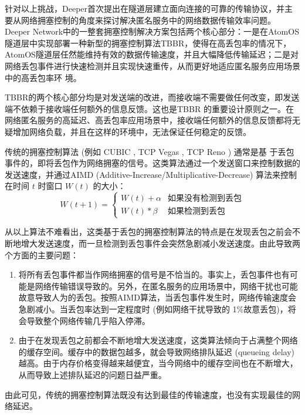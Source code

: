 \documentclass[a4paper]{article}
\begin{document}
针对以上挑战，Deeper首次提出在隧道层建立面向连接的可靠的传输协议，并主要从网络拥塞控制的角度来探讨解决匿名服务中的网络数据传输效率问题。Deeper Network中的一整套拥塞控制解决方案包括两个核心部分：一是在AtomOS隧道层中实现部署一种新型的拥塞控制算法TBBR，使得在高丢包率的情况下，AtomOS隧道层任然能维持有效的数据传输速度，并且大幅降低传输延迟；二是对网络丢包事件进行快速检测并且实现快速重传，从而更好地适应匿名服务应用场景中的高丢包率环
境。

TBBR的两个核心部分均是对发送端的改进，而接收端不需要做任何改变，即发送端不依赖于接收端任何额外的信息反馈。这也是TBBR 的重要设计原则之一。在网络匿名服务的高延迟、高丢包率应用场景中，接收端任何额外的信息反馈都将无疑增加网络负载，并且在这样的环境中，无法保证任何稳定的反馈。

传统的拥塞控制算法 (例如 CUBIC \cite{ha2008cubic}, TCP Vegas \cite{brakmo1995tcp}, TCP Reno \cite{padhye2000modeling}) 通常是基
于丢包事件的，即将丢包作为网络拥塞的信号。这类算法通过一个发送窗口来控制数据的发送速度，并通过AIMD (Additive-Increase/Multiplicative-Decrease) 算法来控制在时间 $t$ 时窗口 $W(t)$ 的大小：
\begin{equation}
W(t+1) = \left\{ \begin{array}{ll}
	W(t) + \alpha & \mbox{如果没有检测到丢包} \\
	W(t) * \beta & \mbox{如果检测到丢包}
	\end{array} \right.
\end{equation}

从以上算法不难看出，这类基于丢包的拥塞控制算法的特点是在发现丢包之前会不断地增大发送速度，而一旦检测到丢包事件会突然急剧减小发送速度。由此导致两个方面的主要问题：
\begin{enumerate}
\item 将所有丢包事件都当作网络拥塞的信号是不恰当的。事实上，丢包事件也有可能是网络传输错误导致的。另外，在匿名服务的应用场景中，网络干扰也可能故意导致人为的丢包。按照AIMD算法，当丢包事件发生时，网络传输速度会急剧减小。当丢包率达到一定程度时 (例如网络干扰导致的 1\%故意丢包)，将
会导致整个网络传输几乎陷入停滞。
\item 由于在发现丢包之前都会不断地增大发送速度，这类算法倾向于占满整个网络的缓存空间。缓存中的数据包越多，就会导致网络排队延迟 (queueing delay) 越高。由于内存价格变得越来越便宜，当今网络中的缓存空间也在不断增大，从而导致上述排队延迟的问题日益严重。
\end{enumerate}
由此可见，传统的拥塞控制算法既没有达到最佳的传输速度，也没有实现最佳的网络延迟。
\end{document}
